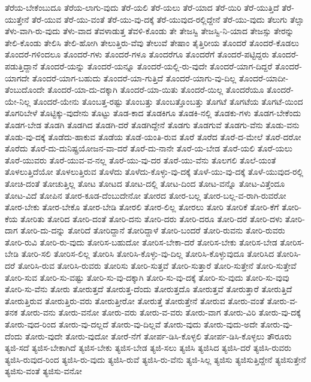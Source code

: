 {ತೆರೆಯ-ಬೇಕೆಂಬುದೂ
ತೆರೆಯ-ಲಾಗು-ವುದು
ತೆರೆ-ಯಲಿ
ತೆರೆ-ಯಲು
ತೆರೆ-ಯಾದ
ತೆರೆ-ಯಿರಿ
ತೆರೆ-ಯುತ್ತಿದೆ
ತೆರೆ-ಯುತ್ತೇನೆ
ತೆರೆ-ಯುವ
ತೆರೆ-ಯು-ವಂತೆ
ತೆರೆ-ಯು-ವು-ದಕ್ಕೆ
ತೆರೆ-ಯುವುದ-ರಲ್ಲಿದ್ದೇನೆ
ತೆರೆ-ಯು-ವುದು
ತೆಲುಗು
ತೆಲ್ಸಾ
ತೆಳು-ವಾಗಿ-ರು-ವುದು
ತೆಳು-ವಾದ
ತೆವಳಾಡುತ್ತ
ತೆವಳಿ-ಕೊಂಡು
ತೇ
ತೇಜಸ್ವಿ
ತೇಜಸ್ವಿ-ನಿ-ಯಾದ
ತೇಜಸ್ಸು
ತೇರನ್ನು
ತೇಲಿ-ಕೊಂಡು
ತೇಲಿಸಿ
ತೇಲಿ-ಹೋಗಿ
ತೇಲುತ್ತಿರು-ವೆವು
ತೇಲುವೆ
ತೇಷಾಂ
ತೈತ್ತಿರೀಯ
ತೊಂದರೆ
ತೊಂದರೆ-ಕೊಡಲು
ತೊಂದರೆ-ಗಳಿಂದಲೂ
ತೊಂದರೆ-ಗಳು
ತೊಂದರೆ-ಗಳೂ
ತೊಂದರೆಗೂ
ತೊಂದರೆಗೆ
ತೊಂದರೆ-ಪಟ್ಟಿದ್ದರು
ತೊಂದರೆ-ಪಡುತ್ತಿದ್ದಾನೆ
ತೊಂದರೆ-ಯನ್ನು
ತೊಂದರೆ-ಯನ್ನೂ
ತೊಂದರೆ-ಯಲ್ಲಿ-ರು-ವುದೇ
ತೊಂದರೆ-ಯಾಗ-ದಿದ್ದರೆ
ತೊಂದರೆ-ಯಾಗದೇ
ತೊಂದರೆ-ಯಾಗ-ಬಹುದು
ತೊಂದರೆ-ಯಾ-ಗುತ್ತಿದೆ
ತೊಂದರೆ-ಯಾಗು-ವು-ದಿಲ್ಲ
ತೊಂದರೆ-ಯಾದೀ-ತೆಂಬುದೊಂದೇ
ತೊಂದರೆ-ಯಾ-ದು-ದಕ್ಕಾಗಿ
ತೊಂದರೆ-ಯಾ-ಯಿತು
ತೊಂದರೆ-ಯಿಲ್ಲ
ತೊಂದರೆಯೂ
ತೊಂದರೆ-ಯೇ-ನಿಲ್ಲ
ತೊಂದರೆ-ಯೇನು
ತೊಂಬತ್ತ-ರಷ್ಟು
ತೊಂಬತ್ತು
ತೊಂಬತ್ತೊಂಬತ್ತು
ತೊಗಟೆ
ತೊಗಟೆಯ
ತೊಗಟೆ-ಯಿಂದ
ತೊಗರಿಬೇಳೆ
ತೊಟ್ಟಿಕ್ಕು-ವುದೇನು
ತೊಟ್ಟು
ತೊಡ-ಕಾದ
ತೊಡಕಿಗೂ
ತೊಡಕಿ-ನಲ್ಲಿ
ತೊಡಕು-ಗಳು
ತೊಡಗ-ಬೇಕೆಂದು
ತೊಡಗ-ಬೇಡ
ತೊಡಗಿ
ತೊಡಗಿದ
ತೊಡಗಿ-ದರೆ
ತೊಡಗಿದ್ದೇನೆ
ತೊಡಗು
ತೊಡಗುವೆ
ತೊಡಗು-ವೆನು
ತೊಡು-ವನು
ತೊಡು-ವು-ದಕ್ಕೆ
ತೊಡೆದು-ಹಾಕುವ
ತೊಡೆಯ
ತೊಡೆ-ಯಂತಿ-ರುವ
ತೊರೆ
ತೊರೆದ
ತೊರೆ-ದ-ಮೇಲೆ
ತೊರೆ-ದರೋ
ತೊರೆದು
ತೊರೆ-ದು-ದುನಿಷ್ಪ್ರಯೋಜನ-ವಾ-ದರೆ
ತೊರೆ-ದು-ನಾನೇ
ತೊರೆ-ಯ-ಬೇಡ
ತೊರೆ-ಯಲಿ
ತೊರೆ-ಯಲು
ತೊರೆ-ಯುವರು
ತೊರೆ-ಯುವ-ವ-ನಲ್ಲ
ತೊರೆ-ಯು-ವು-ದರ
ತೊರೆ-ಯು-ವೆನು
ತೊಲಗಲಿ
ತೊಲೆ-ಯಂತೆ
ತೊಳಲುತ್ತಿದೆಯೋ
ತೊಳಲುತ್ತಿರುವ
ತೊಳೆದು
ತೊಳೆದು-ಕೊಳ್ಳು-ವು-ದಕ್ಕೆ
ತೊಳೆ-ಯು-ವು-ದಕ್ಕೆ
ತೊಳೆ-ಯುವುದ-ರಲ್ಲಿ
ತೋಚಿ-ದಂತೆ
ತೋಚುತ್ತಿಲ್ಲ
ತೋಟ
ತೋಟದ
ತೋಟ-ದಲ್ಲಿ
ತೋಟ-ದಿಂದ
ತೋಟ-ವನ್ನೊ
ತೋಟ-ವಿತ್ತೆಂದೂ
ತೋಟ-ವಿದೆ
ತೋಪಿನ
ತೋರ-ಕೂಡ-ದೆಂಬುದೇನೋ
ತೋರದ
ತೋರ-ಬಲ್ಲ
ತೋರ-ಬಲ್ಲ-ವ-ರಾಗಿ-ರುವರೋ
ತೋರ-ಬೇಕು
ತೋರ-ಬೇಕೊ
ತೋರ-ಬೇಡಿ
ತೋರಲಿ
ತೋರ-ಲಿಲ್ಲ
ತೋರಲು
ತೋರಿ
ತೋರಿಕೆ
ತೋರಿ-ಕೆಗೆ
ತೋರಿ-ಕೆಯ
ತೋರಿತು
ತೋರಿದ
ತೋರಿ-ದಂತೆ
ತೋರಿ-ದನು
ತೋರಿ-ದರು
ತೋರಿ-ದರೂ
ತೋರಿ-ದರೆ
ತೋರಿ-ದಳು
ತೋರಿ-ದಾಗ
ತೋರಿ-ದು-ದನ್ನು
ತೋರಿದೆ
ತೋರಿದ್ದಾನೆ
ತೋರಿದ್ದಾಳೆ
ತೋರಿ-ಬಂದರೆ
ತೋರಿ-ರುವನು
ತೋರಿ-ರುವರು
ತೋರಿ-ರುವಿ
ತೋರಿ-ರು-ವುದು
ತೋರಿಸ-ಬಹುದೋ
ತೋರಿಸ-ಬೇಕಾ-ದರೆ
ತೋರಿಸ-ಬೇಕು
ತೋರಿಸ-ಬೇಡ
ತೋರಿಸ-ಬೇಡಿ
ತೋರಿ-ಸಲಿ
ತೋರಿಸ-ಲಿಲ್ಲ
ತೋರಿಸಿ
ತೋರಿಸಿ-ಕೊಳ್ಳು-ವು-ದಿಲ್ಲ
ತೋರಿಸಿ-ಕೊಳ್ಳುವುದೂ
ತೋರಿಸಿದ
ತೋರಿಸಿ-ದರೆ
ತೋರಿಸಿ-ರುವ
ತೋರಿಸಿ-ರುವರು
ತೋರಿಸು
ತೋರಿ-ಸುತ್ತವೆ
ತೋರಿ-ಸುತ್ತಾರೆ
ತೋರಿ-ಸುತ್ತೇನೆ
ತೋರಿ-ಸುತ್ತೇವೆ
ತೋರಿ-ಸುವ
ತೋರಿ-ಸು-ವಷ್ಟು
ತೋರಿ-ಸು-ವು-ದಕ್ಕಾಗಿ
ತೋರಿ-ಸು-ವು-ದಕ್ಕೆ
ತೋರಿ-ಸು-ವುದು
ತೋರಿ-ಸು-ವುವು
ತೋರಿ-ಸು-ವೆನು
ತೋರು
ತೋರುತ್ತದೆ
ತೋರುತ್ತ-ದೆಂದು
ತೋರುತ್ತದೊ
ತೋರುತ್ತವೆ
ತೋರುತ್ತಾರೆ
ತೋರುತ್ತಿದೆ
ತೋರುತ್ತಿರುವ
ತೋರುತ್ತಿರು-ವರು
ತೋರುತ್ತೀರೋ
ತೋರುತ್ತೆ
ತೋರುತ್ತೇನೆ
ತೋರುವ
ತೋರು-ವಂತೆ
ತೋರು-ವ-ತನಕ
ತೋರು-ವನು
ತೋರು-ವನೋ
ತೋರು-ವರು
ತೋರು-ವ-ವರು
ತೋರು-ವಾಗ
ತೋರು-ವಿರಿ
ತೋರು-ವು-ದಕ್ಕೆ
ತೋರು-ವುದ-ರಿಂದ
ತೋರು-ವು-ದಲ್ಲದೆ
ತೋರು-ವು-ದಿಲ್ಲವೆ
ತೋರು-ವುದು
ತೋರು-ವುದು-ಅದೇ
ತೋರು-ವು-ದೆಂದು
ತೋರು-ವುದೇ
ತೋರು-ವುದೋ
ತೋರೆ-ನೆಗೆ
ತೋರ್ಪ-ಡಿಸಿ-ಕೊಳ್ಳಲಿ
ತೋರ್ಪ-ಡಿಸಿ-ಕೊಳ್ಳಲು
ತೌರೂರು
ತ್ಯಜಿ-ಸದೆ
ತ್ಯಜಿಸ-ಬೇಕಾಗಿದೆ
ತ್ಯಜಿಸ-ಬೇಕು
ತ್ಯಜಿಸ-ಬೇಡ
ತ್ಯಜಿ-ಸಲು
ತ್ಯಜಿಸಿ
ತ್ಯಜಿಸಿದ
ತ್ಯಜಿಸಿ-ದರೆ
ತ್ಯಜಿಸಿ-ರುವರು
ತ್ಯಜಿಸಿ-ರುವುದ-ರಿಂದ
ತ್ಯಜಿಸಿ-ರು-ವುದು
ತ್ಯಜಿಸಿ-ರುವೆ
ತ್ಯಜಿಸಿ-ರು-ವೆನು
ತ್ಯಜಿ-ಸಿಲ್ಲ
ತ್ಯಜಿಸು
ತ್ಯಜಿಸುತ್ತಿದ್ದೇನೆ
ತ್ಯಜಿಸುತ್ತೇನೆ
ತ್ಯಜಿಸು-ವಂತೆ
ತ್ಯಜಿಸು-ವನೋ
}
